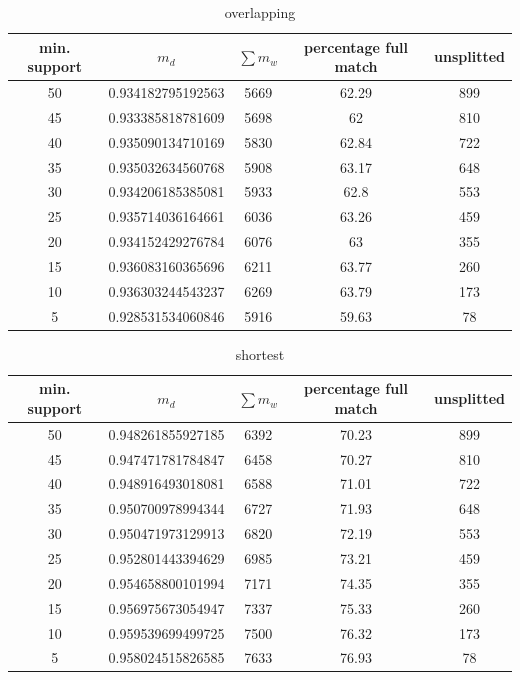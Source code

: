\begin{table}[h!]
\centering
\begin{tabular}{|c|c|c|c|c|}
\hline
min. support & $m_d$ & $\sum m_w$ & percentage full match & unsplitted\\ 
\hline
\hline
50 & 0.934182795192563 & 5669 & 62.29 & 899\\ 
\hline
45 & 0.933385818781609 & 5698 & 62 & 810\\ 
\hline
40 & 0.935090134710169 & 5830 & 62.84 & 722\\ 
\hline
35 & 0.935032634560768 & 5908 & 63.17 & 648\\ 
\hline
30 & 0.934206185385081 & 5933 & 62.8 & 553\\ 
\hline
25 & 0.935714036164661 & 6036 & 63.26 & 459\\ 
\hline
20 & 0.934152429276784 & 6076 & 63 & 355\\ 
\hline
15 & 0.936083160365696 & 6211 & 63.77 & 260\\ 
\hline
10 & 0.936303244543237 & 6269 & 63.79 & 173\\ 
\hline
5 & 0.928531534060846 & 5916 & 59.63 & 78\\ 
\hline\end{tabular}
\label{table:table}
\caption{overlapping} 
\end{table}

 \begin{table}[h!]
\centering
\begin{tabular}{|c|c|c|c|c|}
\hline
min. support & $m_d$ & $\sum m_w$ & percentage full match & unsplitted\\ 
\hline
\hline
50 & 0.948261855927185 & 6392 & 70.23 & 899\\ 
\hline
45 & 0.947471781784847 & 6458 & 70.27 & 810\\ 
\hline
40 & 0.948916493018081 & 6588 & 71.01 & 722\\ 
\hline
35 & 0.950700978994344 & 6727 & 71.93 & 648\\ 
\hline
30 & 0.950471973129913 & 6820 & 72.19 & 553\\ 
\hline
25 & 0.952801443394629 & 6985 & 73.21 & 459\\ 
\hline
20 & 0.954658800101994 & 7171 & 74.35 & 355\\ 
\hline
15 & 0.956975673054947 & 7337 & 75.33 & 260\\ 
\hline
10 & 0.959539699499725 & 7500 & 76.32 & 173\\ 
\hline
5 & 0.958024515826585 & 7633 & 76.93 & 78\\ 
\hline\end{tabular}
\label{table:table}
\caption{shortest} 
\end{table}





